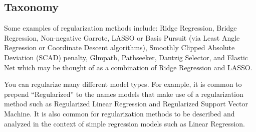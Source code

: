\begin{bibunit}
\subsection{Taxonomy}
Some examples of regularization methods include:
Ridge Regression,
Bridge Regression, 
Non-negative Garrote,
LASSO or Basis Pursuit (via Least Angle Regression or Coordinate Descent algorithms),
Smoothly Clipped Absolute Deviation (SCAD) penalty,
Glmpath,
Pathseeker,
Dantzig Selector, 
and Elastic Net which may be thought of as a combination of Ridge Regression and LASSO.

You can regularize many different model types. For example, it is common to prepend ``Regularized'' to the names models that make use of a regularization method such as Regularized Linear Regression and Regularized Support Vector Machine. It is also common for regularization methods to be described and analyzed in the context of simple regression models such as Linear Regression.


\putbib
\end{bibunit}

\newpage\begin{bibunit}\putbib\end{bibunit}
\newpage\begin{bibunit}\putbib\end{bibunit}
\newpage\begin{bibunit}\putbib\end{bibunit}
\newpage\begin{bibunit}\putbib\end{bibunit}
